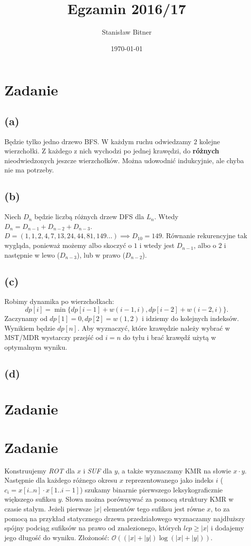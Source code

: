 \documentclass[12pt, a4paper]{article}
\title{Egzamin 2016/17}
\author{Stanisław Bitner}
\date{\today}
\newcommand{\MCALO}{\mathcal{O}}
\newcounter{zadanie}
\newcommand{\zadanie}{\addtocounter{zadanie}{1}\section*{Zadanie \arabic{zadanie}}}
\begin{document}
\maketitle
\zadanie{}
\subsection*{(a)}
Będzie tylko jedno drzewo BFS. W każdym ruchu odwiedzamy $2$ kolejne
wierzchołki. Z każdego z nich wychodzi po jednej krawędzi, do \textbf{różnych}
nieodwiedzonych jeszcze wierzchołków. Można udowodnić indukcyjnie, ale chyba
nie ma potrzeby.

\subsection*{(b)}
Niech $D_n$ będzie liczbą różnych drzew DFS dla $L_n$. Wtedy
$D_n = D_{n-1} + D_{n-2} + D_{n-3}$.\\ $D = (1,1,2,4,7,13,24,44,81,149...)
\implies D_{10} = 149$. Równanie rekurencyjne tak wygląda, ponieważ możemy albo
skoczyć o $1$ i wtedy jest $D_{n-1}$, albo o $2$ i następnie w lewo
($D_{n-3}$), lub w prawo ($D_{n-2}$).

\subsection*{(c)}
Robimy dynamika po wierzchołkach:
$$\mathit{dp}[i] = \min\{\mathit{dp}[i-1] + w(i-1,i),\mathit{dp}[i-2] + w(i-2,i)\}.$$
Zaczynamy od $\mathit{dp[1]=0, dp[2]=w(1,2)}$ i idziemy do kolejnych indeksów.
Wynikiem będzie $\mathit{dp}[n]$. Aby wyznaczyć, które krawędzie należy wybrać
w MST/MDR wystarczy przejść od $i=n$ do tyłu i brać krawędź użytą w optymalnym
wyniku.

\subsection*{(d)}

\zadanie{}

\zadanie{}
Konstruujemy \textit{ROT} dla $x$ i \textit{SUF} dla $y$, a także wyznaczamy
KMR na słowie $x \cdot y$. Następnie dla każdego różnego okresu $x$
reprezentowanego jako indeks $i$ ($c_i = x[i..n] \cdot x[1..i-1]$) szukamy
binarnie pierwszego leksykograficznie większego sufiksu $y$. Słowa można
porównywać za pomocą struktury KMR w czasie stałym. Jeżeli pierwsze $|x|$
elementów tego sufiksu jest równe $x$, to za pomocą na przykład statycznego
drzewa przedziałowego wyznaczamy najdłuższy spójny podciąg sufiksów na prawo od
znalezionego, których $lcp \ge |x|$ i dodajemy jego długość do wyniku.
Złożoność: $\MCALO((|x|+|y|)\log{(|x|+|y|)})$.
\end{document}
